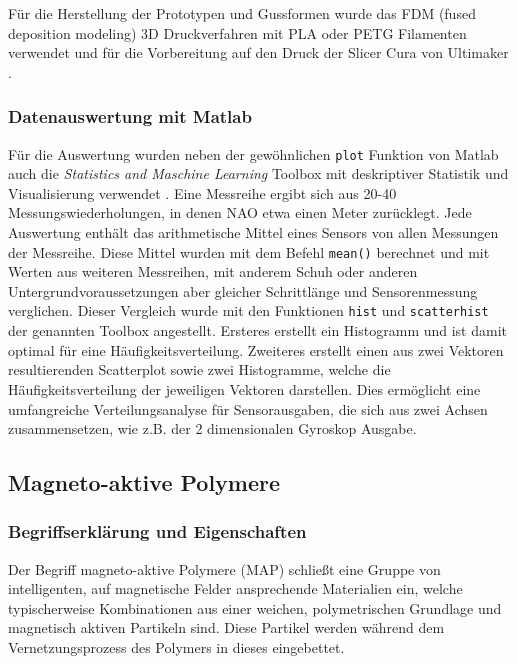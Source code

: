 Für die Herstellung der Prototypen und Gussformen wurde das FDM (fused deposition modeling) 3D Druckverfahren mit PLA oder PETG Filamenten verwendet und für die Vorbereitung auf den Druck der Slicer Cura von Ultimaker \cite{cura}.

\subsubsection*{Datenauswertung mit Matlab}
Für die Auswertung wurden neben der gewöhnlichen \texttt{plot} Funktion von Matlab \cite{matlab} auch die \textit{Statistics and Maschine Learning} Toolbox mit deskriptiver Statistik und Visualisierung verwendet \cite{toolbox}. 
Eine Messreihe ergibt sich aus 20-40 Messungswiederholungen, in denen NAO etwa einen Meter zurücklegt. Jede Auswertung enthält das arithmetische Mittel eines Sensors von allen Messungen der Messreihe. Diese Mittel wurden mit dem Befehl \texttt{mean()} berechnet und mit Werten aus weiteren Messreihen, mit anderem Schuh oder anderen Untergrundvoraussetzungen aber gleicher Schrittlänge und Sensorenmessung verglichen. Dieser Vergleich wurde mit den Funktionen \texttt{hist} und \texttt{scatterhist} der genannten Toolbox angestellt. Ersteres erstellt ein Histogramm und ist damit optimal für eine Häufigkeitsverteilung. Zweiteres erstellt einen aus zwei Vektoren resultierenden Scatterplot sowie zwei Histogramme, welche die Häufigkeitsverteilung der jeweiligen Vektoren darstellen. Dies ermöglicht eine umfangreiche Verteilungsanalyse für Sensorausgaben, die sich aus zwei Achsen zusammensetzen, wie z.B. der 2 dimensionalen Gyroskop Ausgabe.

\FloatBarrier
\subsection{Magneto-aktive Polymere}\label{kap_MAP}
\subsubsection*{Begriffserklärung und Eigenschaften}
Der Begriff magneto-aktive Polymere (MAP) schließt eine Gruppe von intelligenten, auf magnetische Felder ansprechende Materialien ein, welche typischerweise Kombinationen aus einer weichen, polymetrischen Grundlage und magnetisch aktiven Partikeln sind. Diese Partikel werden während dem Vernetzungsprozess des Polymers in dieses eingebettet. 

